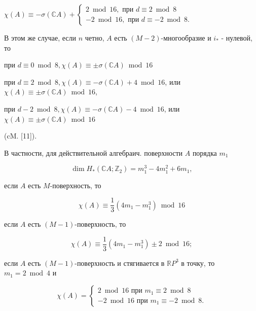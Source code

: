 \documentclass[10pt]{article}
\begin{document}
$\chi(A) \equiv-\sigma(\mathbb{C} A)+\left\{\begin{array}{r}2 \bmod 16, \text { при } d \equiv 2 \bmod 8 \\ -2 \bmod 16, \text { при } d \equiv-2 \bmod 8 .\end{array}\right.$



В этом же случае, если $n$ четно, $A$ есть $(M-2)$-многообразие и $i_{*}$ - нулевой, то



при $d \equiv 0 \bmod 8, \chi(A) \equiv \pm \sigma(\mathbb{C} A) \bmod 16$



при $d \equiv 2 \bmod 8, \chi(A) \equiv-\sigma(\mathbb{C} A)+4 \bmod 16$, или $\chi(A) \equiv \pm \sigma(\mathbb{C} A) \bmod 16$,



при $d-2 \bmod 8, \chi(A) \equiv-\sigma(\mathbb{C} A)-4 \bmod 16$, или $\chi(A) \equiv \pm \sigma(\mathbb{C} A) \bmod 16$



(cM. [11]).



В частности, для действительной алгебраич. поверхности $A$ порядка $m_{1}$



\[

\operatorname{dim} H_{*}\left(\mathbb{C} A ; \mathbb{Z}_{2}\right)=m_{1}^{3}-4 m_{1}^{2}+6 m_{1},

\]



если $A$ есть $M$-поверхность, то



\[

\chi(A) \equiv \frac{1}{3}\left(4 m_{1}-m_{1}^{3}\right) \bmod 16

\]



если $A$ есть $(M-1)$-поверхность, то



\[

\chi(A) \equiv \frac{1}{3}\left(4 m_{1}-m_{1}^{3}\right) \pm 2 \bmod 16 ;

\]



если $A$ есть $(M-1)$-поверхность и стягивается в $\mathbb{R} P^{3}$ в точку, то $m_{1}=2 \bmod 4$ и



\[

\chi(A)=\left\{\begin{array}{r}

2 \bmod 16 \text { при } m_{1} \equiv 2 \bmod 8 \\

-2 \bmod 16 \text { при } m_{1} \equiv-2 \bmod 8 .

\end{array}\right.

\]
\end{document}
